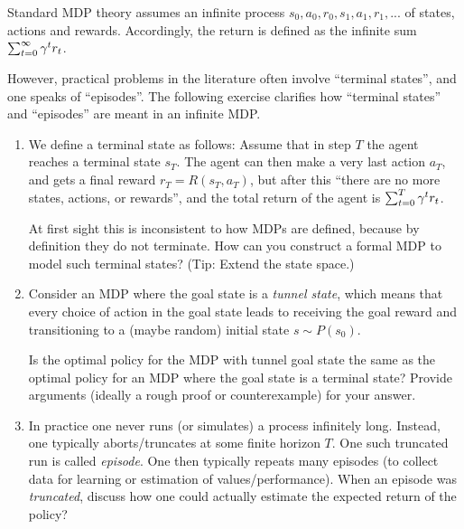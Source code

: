 

Standard MDP theory assumes an infinite process
$s_0,a_0,r_0,s_1,a_1,r_1,...$ of states, actions and rewards. Accordingly, the return is defined as the infinite sum $\sum_{t=0}^\infty \gamma^t r_t$.

However, practical problems in the literature often involve ``terminal states'', and one speaks of ``episodes''. The following exercise clarifies how ``terminal states'' and ``episodes'' are meant in an infinite MDP.

\begin{enumerate}
\item We define a terminal state as follows: Assume that in step $T$ the agent reaches a terminal state $s_T$. The agent can then make a very last action $a_T$, and gets a final reward $r_T = R(s_T, a_T)$, but after this ``there are no more states, actions, or rewards'', and the total return of the agent is $\sum_{t=0}^T \gamma^t r_t$.

At first sight this is inconsistent to how MDPs are defined, because by definition they do not terminate. How can you construct a formal MDP to model such terminal states? (Tip: Extend the state space.)


\item Consider an MDP where the goal state is a \emph{tunnel state}, which
means that every choice of action in the goal state leads to receiving
the goal reward and transitioning to a (maybe random) initial state $s\sim P(s_0)$.

Is the optimal policy for the MDP with tunnel goal state the same as the optimal policy for an MDP where the goal state is a terminal state? Provide arguments (ideally a rough proof or counterexample) for your answer.



\item In practice one never runs (or simulates) a process infinitely
long. Instead, one typically aborts/truncates at some finite horizon
$T$. One such truncated run is
called \emph{episode}. One then typically repeats many episodes (to
collect data for learning or estimation of values/performance). When
an episode was \emph{truncated}, discuss how one could actually
estimate the expected return of the policy?


\end{enumerate}

